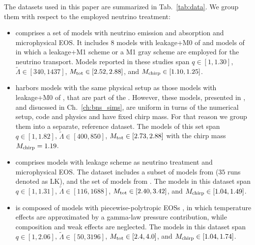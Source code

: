 The datasets used in this paper are summarized in Tab.~\ref{tab:data}.
We group them with respect to the employed neutrino treatment:

\begin{itemize}
    \item \DSheatcool{} comprises a set of models with neutrino emission 
    and absorption and microphysical \ac{EOS}. It includes 
    $8$ models with leakage+M0 of \citet{Radice:2018pdn} and models 
    of \citet{Sekiguchi:2015dma,Sekiguchi:2016bjd,Vincent:2019kor}
    in which a leakage+M1 scheme or a M1 gray scheme are employed for the neutrino transport. 
    Models reported in these studies span 
    $q\in[1, 1.30]$, 
    $\tilde{\Lambda}\in[340, 1437]$, 
    $M_{\rm tot}\in[2.52,2.88]$, 
    and $M_{\rm chirp}\in[1.10,1.25]$.
    \item \DSrefset{} harbors models with the same physical setup as 
    those models with leakage+M0 of \citet{Radice:2018pdn}, that are 
    part of the \DSheatcool{}. However, these models, presented in 
    \citet{Perego:2019adq,Nedora:2019jhl,Bernuzzi:2020txg,Nedora:2020pak}, 
    and disucssed in Ch.~\ref{ch:bns_sims}, are uniform in turns of the 
    numerical setup, code and physics and have fixed chirp mass. 
    For that reason we group them into a separate, reference dataset. 
    The models of this set span $q\in[1, 1.82]$, 
    $\tilde{\Lambda}\in[400, 850]$, 
    $M_{\rm tot}\in[2.73,2.88]$ with 
    the chirp mass $M_{\rm chirp}=1.19$.
    \item \DScool{} comprises models with leakage scheme as neutrino treatment and 
    microphysical \ac{EOS}. The dataset includes a subset of models from 
    \citet{Radice:2018pdn} ($35$ runs denoted as LK),
    and the set of models from \citet{Lehner:2016lxy}.
    The models in this dataset span $q\in[1, 1.31]$, 
    $\tilde{\Lambda}\in[116, 1688]$, 
    $M_{\rm tot}\in[2.40,3.42]$, 
    and $M_{\rm chirp}\in[1.04,1.49]$.
    \item \DSnone{} is composed of models with piecewise-polytropic \acp{EOS} 
    \citet{Hotokezaka:2012ze,Dietrich:2015iva,Dietrich:2016hky,
        Kiuchi:2019lls,Bauswein:2013yna},
    in which temperature effects are approximated by a
    gamma-law pressure contribution, while
    composition and weak effects are neglected.
    The models in this dataset span 
    $q\in[1, 2.06]$, 
    $\tilde{\Lambda}\in[50, 3196]$, 
    $M_{\rm tot}\in[2.4,4.0]$, 
    and $M_{\rm chirp}\in[1.04,1.74]$.
\end{itemize}

